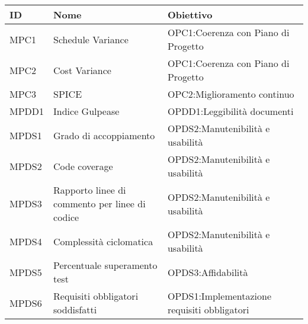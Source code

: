 			\begin{center}
			\begin{longtable}{ | >{\centering\arraybackslash}m{2.5cm} 
							   | >{\raggedright\arraybackslash}m{4cm} 
							   | >{\raggedright\arraybackslash}m{5.7cm} 
							   |  }
        
        	\hline
        		\textbf{ID} & \textbf{Nome} & \textbf{Obiettivo} \\ \hline
        	\endhead
			        
				MPC1 & Schedule Variance & OPC1:Coerenza con Piano di Progetto \\ \hline
			        											
			    MPC2 & Cost Variance & OPC1:Coerenza con Piano di Progetto \\ \hline
			      															
				MPC3 & SPICE & OPC2:Miglioramento continuo \\ \hline

				MPDD1 & Indice Gulpease & OPDD1:Leggibilità documenti \\ \hline

				MPDS1 & Grado di accoppiamento  & OPDS2:Manutenibilità e usabilità \\ \hline

			    MPDS2 & Code coverage  & OPDS2:Manutenibilità e usabilità \\ \hline

			    MPDS3 & Rapporto linee di commento per linee di codice  & OPDS2:Manutenibilità e usabilità \\ \hline

			    MPDS4 & Complessità ciclomatica  &  OPDS2:Manutenibilità e usabilità \\ \hline

				MPDS5 & Percentuale superamento test & OPDS3:Affidabilità \\ \hline

				MPDS6 & Requisiti obbligatori soddisfatti & 
						OPDS1:Im\-ple\-men\-ta\-zio\-ne requisiti obbligatori\\ \hline
															
			\end{longtable}
			\end{center}\\            
